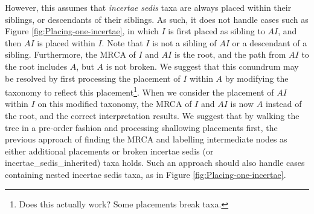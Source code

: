 \documentclass[english]{article}
\begin{document}
However, this assumes that \emph{incertae sedis} taxa are always
placed within their siblings, or descendants of their siblings.
As
such, it does not handle cases such as Figure \ref{fig:Placing-one-incertae}, 
in which $I$ is first placed as sibling to $AI$, and then
$AI$ is placed within $I$.
Note that $I$ is not a sibling of $AI$ or a
descendant of a sibling.
Furthermore, the MRCA of $I$ and $AI$ is the
root, and the path from $AI$ to the root includes $A$, but $A$ is not
broken.
We suggest that this conundrum may be resolved by first
processing the placement of $I$ within $A$ by modifying the taxonomy
to reflect this placement\footnote{Does this actually work? Some
placements break taxa.}.
When we consider the placement of $AI$ within
$I$ on this modified taxonomy, the MRCA of $I$ and $AI$ is now $A$
instead of the root, and the correct interpretation results.
We
suggest that by walking the tree in a pre-order fashion and processing
shallowing placements first, the previous approach of finding the MRCA
and labelling intermediate nodes as either additional placements or
broken incertae sedis (or incertae\_sedis\_inherited) taxa holds.
Such
an approach should also handle cases containing nested incertae sedis
taxa, as in Figure \ref{fig:Placing-one-incertae}.

\end{document}
